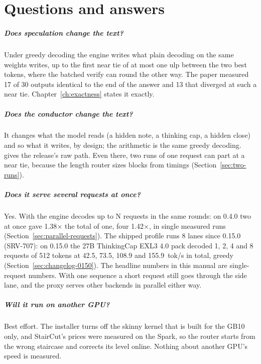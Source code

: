 \chapter{Questions and answers}\label{ch:faq}

\paragraph{Does speculation change the text?} Under greedy decoding the engine writes what plain decoding on the same weights writes, up to the first near tie of at most one ulp between the two best tokens, where the batched verify can round the other way. The paper measured 17 of 30 outputs identical to the end of the answer and 13 that diverged at such a near tie. Chapter~\ref{ch:exactness} states it exactly.

\paragraph{Does the conductor change the text?} It changes what the model reads (a hidden note, a thinking cap, a hidden close) and so what it writes, by design; the arithmetic is the same greedy decoding.  gives the release's raw path. Even there, two runs of one request can part at a near tie, because the length router sizes blocks from timings (Section~\ref{sec:two-runs}).

\paragraph{Does it serve several requests at once?} Yes. With  the engine decodes up to N requests in the same rounds: on 0.4.0 two at once gave 1.38$\times$ the total of one, four 1.42$\times$, in single measured runs (Section~\ref{sec:parallel-requests}). The shipped profile runs 8 lanes since 0.15.0 (SRV-707): on 0.15.0 the 27B ThinkingCap EXL3 4.0 pack decoded 1, 2, 4 and 8 requests of 512 tokens at 42.5, 73.5, 108.9 and 155.9~tok/s in total, greedy (Section~\ref{sec:changelog-0150}). The headline numbers in this manual are single-request numbers. With one sequence a short request still goes through the side lane, and the proxy serves other backends in parallel either way.

\paragraph{Will it run on another GPU?} Best effort. The installer turns off the skinny kernel that is built for the GB10 only, and StairCut's prices were measured on the Spark, so the router starts from the wrong staircase and corrects its level online. Nothing about another GPU's speed is measured.

